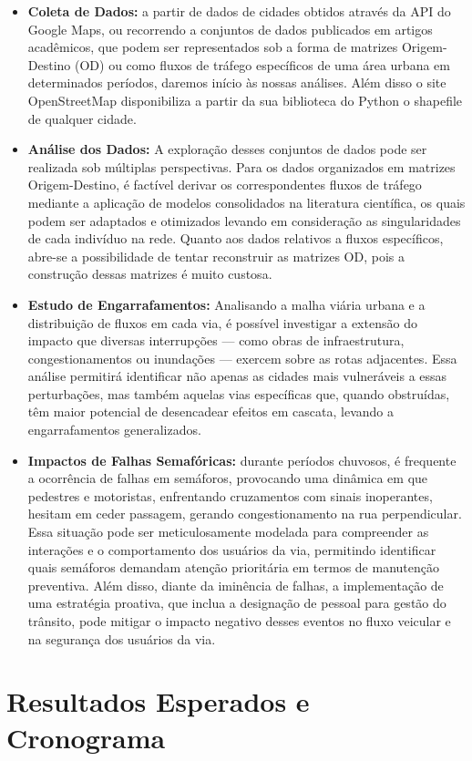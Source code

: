 \documentclass{article}
\begin{document}
\begin{itemize}
    \item \textbf{Coleta de Dados:} a partir de dados de cidades obtidos através da API do Google Maps, ou recorrendo a conjuntos de dados publicados em artigos acadêmicos, que podem ser representados sob a forma de matrizes Origem-Destino (OD) ou como fluxos de tráfego específicos de uma área urbana em determinados períodos, daremos início às nossas análises. Além disso o site OpenStreetMap disponibiliza a partir da sua biblioteca do Python o shapefile de qualquer cidade.
    \item \textbf{Análise dos Dados:} A exploração desses conjuntos de dados pode ser realizada sob múltiplas perspectivas. Para os dados organizados em matrizes Origem-Destino, é factível derivar os correspondentes fluxos de tráfego mediante a aplicação de modelos consolidados na literatura científica, os quais podem ser adaptados e otimizados levando em consideração as singularidades de cada indivíduo na rede. Quanto aos dados relativos a fluxos específicos, abre-se a possibilidade de tentar reconstruir as matrizes OD, pois a construção dessas matrizes é muito custosa.
    \item \textbf{Estudo de Engarrafamentos:}  Analisando a malha viária urbana e a distribuição de fluxos em cada via, é possível investigar a extensão do impacto que diversas interrupções — como obras de infraestrutura, congestionamentos ou inundações — exercem sobre as rotas adjacentes. Essa análise permitirá identificar não apenas as cidades mais vulneráveis a essas perturbações, mas também aquelas vias específicas que, quando obstruídas, têm maior potencial de desencadear efeitos em cascata, levando a engarrafamentos generalizados. 
    \item \textbf{Impactos de Falhas Semafóricas:} durante períodos chuvosos, é frequente a ocorrência de falhas em semáforos, provocando uma dinâmica em que pedestres e motoristas, enfrentando cruzamentos com sinais inoperantes, hesitam em ceder passagem, gerando congestionamento na rua perpendicular. Essa situação pode ser meticulosamente modelada para compreender as interações e o comportamento dos usuários da via, permitindo identificar quais semáforos demandam atenção prioritária em termos de manutenção preventiva. Além disso, diante da iminência de falhas, a implementação de uma estratégia proativa, que inclua a designação de pessoal para gestão do trânsito, pode mitigar o impacto negativo desses eventos no fluxo veicular e na segurança dos usuários da via.
\end{itemize}

\newpage

\section{Resultados Esperados e Cronograma}

\newpage


\end{document}
